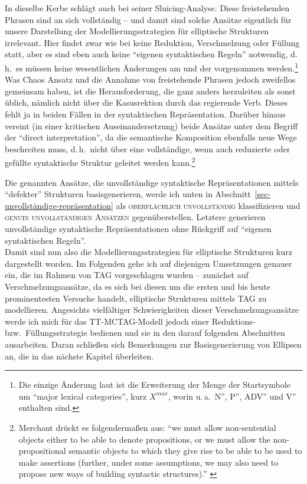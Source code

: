 In dieselbe Kerbe schlägt auch \citet[233ff]{Riemsdijk:78} bei seiner Sluicing-Analyse. Diese freistehenden Phrasen sind an sich vollständig -- und damit sind solche Ansätze eigentlich für unsere Darstellung der Modellierungsstrategien für elliptische Strukturen irrelevant. Hier findet zwar wie bei \cite{Chao:87} keine Reduktion, Verschmelzung oder Füllung statt, aber es sind eben auch keine "`eigenen syntaktischen Regeln"' notwendig, d.\,h.\ es müssen keine wesentlichen Änderungen am  und der  vorgenommen werden.\footnote{Die einzige Änderung laut \citet[53ff]{Barton:90} ist die Erweiterung der Menge der Startsymbole um "`major lexical categories"', kurz $X^{max}$, worin u.\,a.\ N'', P'', ADV'' und V'' enthalten sind.} Was Chaos Ansatz und die Annahme von freistehende Phrasen jedoch zweifellos gemeinsam haben, ist die Herausforderung, die  ganz anders herzuleiten als sonst üblich, nämlich nicht über die Kasusrektion durch das regierende Verb. Dieses fehlt ja in beiden Fällen in der syntaktischen Repräsentation. Darüber hinaus vereint \cite{Merchant:04} (in einer kritischen Auseinandersetzung) beide Ansätze unter dem Begriff der "`direct interpretation"', da die semantische Komposition ebenfalls neue Wege beschreiten muss, d.\,h.\ nicht über eine vollständige, wenn auch reduzierte oder gefüllte syntaktische Struktur geleitet werden kann.\footnote{Merchant drückt es folgenderma\ss en aus: "`we must allow non-sentential objects either to be able to denote propositions, or we must allow the non-propositional semantic objects to which they give rise to be able to be used to make assertions (further, under some assumptions, we may also need to propose new ways of building syntactic structures)."' \citep[662]{Merchant:04}} 

Die genannten Ansätze, die unvollständige syntaktische Repräsentationen mittels "`defekter"' Strukturen basisgenerieren, werde ich unten in Abschnitt~\ref{sec-unvollständige-repräsentation} als \textsc{oberflächlich unvollständig} klassifizieren und \textsc{genuin unvollständigen Ansätzen} gegenüberstellen. Letztere generieren unvollständige syntaktische Repräsentationen ohne Rückgriff auf "`eigenen syntaktischen Regeln"'. \\


Damit sind nun also die Modellierungsstrategien für elliptische Strukturen kurz dargestellt worden. Im Folgenden gehe ich auf diejenigen Umsetzungen genauer ein, die im Rahmen von TAG vorgeschlagen wurden -- zunächst auf Verschmelzungsansätze, da es sich bei diesen um die ersten und bis heute prominentesten Versuche handelt, elliptische Strukturen mittels TAG zu modellieren. Angesichts vielfältiger Schwierigkeiten dieser Verschmelzungsansätze werde ich mich für das TT-MCTAG-Modell jedoch einer Reduktions- bzw.\ Füllungsstrategie bedienen und sie in den darauf folgenden Abschnitten ausarbeiten. Daran schlie\ss en sich Bemerkungen zur Basisgenerierung von Ellipsen an, die in das nächste Kapitel überleiten.    


